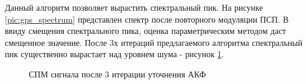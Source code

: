 Данный алгоритм позволяет вырастить спектральный пик. На рисунке \ref{pic:gps_spectrum} представлен спектр после повторного
модуляции ПСП. В ввиду смещения спектрального пика, оценка параметрическим методом даст смещенное значение. После 3х
итераций предлагаемого алгоритма спектральный пик существенно вырастает над уровнем шума - рисунок \ref{pic:GPS_spectrum_iter3}.

\begin{figure}[H]
	\center{}
	\caption{СПМ сигнала после 3 итерации уточнения АКФ}
	\label{pic:GPS_spectrum_iter3}
\end{figure}
